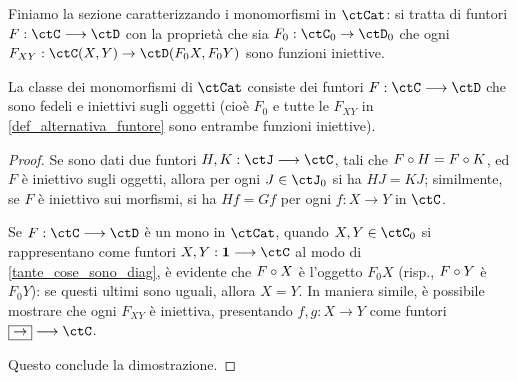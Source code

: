 Finiamo la sezione caratterizzando i monomorfismi in \(\ctCat\): si tratta di funtori \(F : \ctC \fun\ctD\) con la proprietà che sia \(F_0 : \ctC_0\to\ctD_0\) che ogni \(F_{XY} : \Hom\ctC(X,Y) \to \Hom\ctD(F_0X,F_0Y)\) sono funzioni iniettive.
\begin{proposition}\label{mona_in_cat}
	La classe dei monomorfismi di \(\ctCat\) consiste dei funtori \(F : \ctC\fun\ctD\) che sono fedeli e iniettivi sugli oggetti (cioè \(F_0\) e tutte le \(F_{XY}\) in \ref{def_alternativa_funtore} sono entrambe funzioni iniettive).
\end{proposition}
\begin{proof}
	Se sono dati due funtori \(H,K:\ctJ \fun \ctC\), tali che \(F\circ H = F\circ K\), ed \(F\) è iniettivo sugli oggetti, allora per ogni \(J\in\ctJ_0\) si ha \(HJ=KJ\); similmente, se \(F\) è iniettivo sui morfismi, si ha \(Hf = Gf\) per ogni \(f : X\to Y\) in \(\ctC\).

	Se \(F : \ctC \fun\ctD\) è un mono in \(\ctCat\), quando \(X,Y \in\ctC_0\) si rappresentano come funtori \(X,Y : \ctTerm \fun \ctC\) al modo di \ref{tante_cose_sono_diag}, è evidente che \(F\circ X\) è l'oggetto \(F_0X\) (risp., \(F\circ Y\) è \(F_0 Y\)): se questi ultimi sono uguali, allora \(X=Y\). In maniera simile, è possibile mostrare che ogni \(F_{XY}\) è iniettiva, presentando \(f,g : X\to Y\) come funtori \(\genArrow \fun \ctC\).

	Questo conclude la dimostrazione.
\end{proof}
